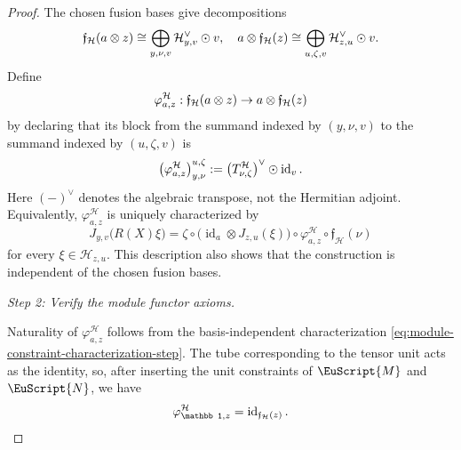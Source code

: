 \documentclass[a4paper,11pt]{article}
\theoremstyle{definition}
\theoremstyle{remark}
\newcommand\eM          {\EuScript{M}}
\newcommand\eN         {\EuScript{N}}
\newcommand{\id}{\operatorname{id}}
\begin{document}
\begin{proof}
The chosen fusion bases give decompositions
\begin{equation}
    \notag
    \mathfrak{f}_{\mathcal H}(a\otimes z) \cong
    \bigoplus_{y,\nu,v}
    \mathcal H_{y,v}^{\vee}\odot v, \quad
    a\otimes\mathfrak{f}_{\mathcal H}(z)
    \cong
    \bigoplus_{u,\zeta,v}
    \mathcal H_{z,u}^{\vee}\odot v.
\end{equation}
Define
\begin{equation}
    \notag
    \varphi^{\mathcal H}_{a,z}:
    \mathfrak{f}_{\mathcal H}(a\otimes z)
    \to 
    a\otimes\mathfrak{f}_{\mathcal H}(z)
\end{equation}
by declaring that its block from the summand indexed by $(y,\nu,v)$ to the summand indexed by $(u,\zeta,v)$ is
\begin{equation}
    \notag
    \left(\varphi^{\mathcal H}_{a,z}\right)^{u,\zeta}_{y,\nu}
    :=
    \left(T^{\mathcal H}_{\nu,\zeta}\right)^{\vee}
    \odot\id_v.
\end{equation}
Here $(-)^{\vee}$ denotes the algebraic transpose, not the Hermitian adjoint. Equivalently, $\varphi^{\mathcal H}_{a,z}$ is uniquely characterized by
\begin{equation}
    J_{y,v}\bigl(R(X )\xi\bigr)
    =
    \zeta
    \circ
    \bigl(\id_a\otimes J_{z,u}(\xi)\bigr)
    \circ
    \varphi^{\mathcal H}_{a,z}
    \circ
    \mathfrak{f}_{\mathcal H}(\nu)
    \label{eq:module-constraint-characterization-step}
\end{equation}
for every $\xi\in\mathcal H_{z,u}$.  This description also shows that the construction is independent of the chosen fusion bases.

\smallskip
\textit{Step 2: Verify the module functor axioms.}

Naturality of $\varphi^{\mathcal H}_{a,z}$ follows from the basis-independent characterization \eqref{eq:module-constraint-characterization-step}.  The tube corresponding to the tensor unit acts as the identity, so, after inserting the unit constraints of $\eM$ and $\eN$, we have
\begin{equation}
    \notag
    \varphi^{\mathcal H}_{\mathbb 1,z}
    =
    \id_{\mathfrak{f}_{\mathcal H}(z)}.
\end{equation}


\end{proof}
\end{document}
